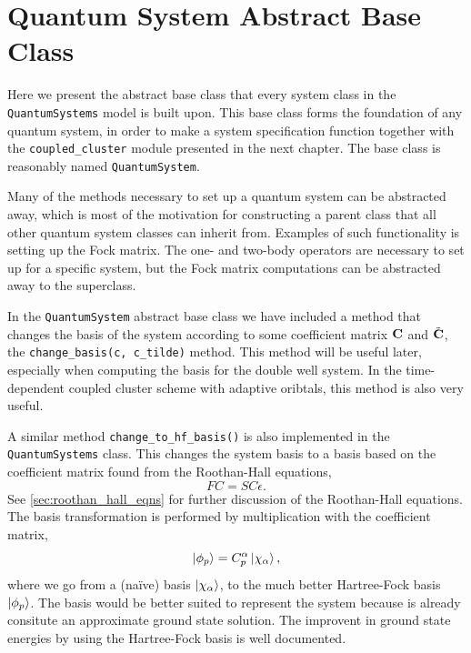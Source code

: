 \section{Quantum System Abstract Base Class} 

Here we present the abstract base class that every system class in the
\lstinline{QuantumSystems} model is built upon. This base class forms the foundation 
of any quantum system, in order to make a system specification function together with 
the \lstinline{coupled_cluster} module presented in the next chapter. The base class is 
reasonably named \lstinline{QuantumSystem}.

Many of the methods necessary to set up a quantum system can be abstracted away, which 
is most of the motivation for constructing a parent class that all other 
quantum system classes can inherit from. Examples of such functionality is 
setting up the Fock matrix. The one- and two-body operators are necessary to set up 
for a specific system, but the Fock matrix computations can be abstracted away 
to the superclass.



In the \lstinline{QuantumSystem} abstract base class we have included a
method that changes the basis of the system according to some coefficient matrix 
$\vb{C}$ and $\tilde{\vb{C}}$, the \lstinline{change_basis(c, c_tilde)} method.
This method will be useful later, especially when 
computing the basis for the double well system. In the time-dependent coupled cluster 
scheme with adaptive oribtals, this method is also very useful. 

A similar method \lstinline{change_to_hf_basis()} is also implemented in the 
\lstinline{QuantumSystems} class. This changes the system basis to a basis based 
on the coefficient matrix found from the Roothan-Hall equations,
\begin{equation}
    FC = SC\epsilon.
\end{equation}
See \autoref{sec:roothan_hall_eqns} for further discussion of the Roothan-Hall equations.
The basis transformation is performed by multiplication with the coefficient matrix,
\begin{equation}
    \ket{\phi_p} = C^\alpha_p \ket{\chi_\alpha},
\end{equation}
where we go from a (naïve) basis $\ket{\chi_\alpha}$, to the much better Hartree-Fock basis 
$\ket{\phi_p}$. The basis would be better suited to represent the system because is 
already consitute an approximate ground state solution. The improvent in ground state 
energies by using the Hartree-Fock basis is well
documented\cite{jorgensen2011many,lohne2010coupled}.

